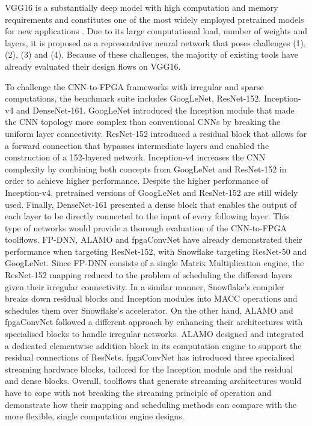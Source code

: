 \documentclass[format=acmsmall, review=false, screen=true]{acmart}
\begin{document}
VGG16 is a substantially deep model with high computation and memory requirements and constitutes one of the most widely employed pretrained models for new applications \cite{Badrinarayanan_2017}. Due to its large computational load, number of weights and layers, it is proposed as a representative neural network that poses challenges (1), (2), (3) and (4). Because of these challenges, the majority of existing tools have already evaluated their design flows on VGG16.

To challenge the CNN-to-FPGA frameworks with irregular and sparse computations, the benchmark suite includes GoogLeNet, ResNet-152, Inception-v4 {\color{black}and DenseNet-161}. GoogLeNet introduced the Inception module that made the CNN topology more complex than conventional CNNs by breaking the uniform layer connectivity. ResNet-152 introduced a residual block that allows for a forward connection that bypasses intermediate layers and enabled the construction of a 152-layered network. Inception-v4 increases the CNN complexity by combining both concepts from GoogLeNet and ResNet-152 in order to achieve higher performance. Despite the higher performance of Inception-v4, pretrained versions of GoogLeNet and ResNet-152 are still widely used. {\color{black}Finally, DenseNet-161 presented a dense block that enables the output of each layer to be directly connected to the input of every following layer.} This type of networks would provide a thorough evaluation of the CNN-to-FPGA toolflows. FP-DNN, ALAMO and fpgaConvNet have already demonstrated their performance when targeting ResNet-152, with Snowflake targeting ResNet-50 and GoogLeNet. Since FP-DNN consists of a single Matrix Multiplication engine, the ResNet-152 mapping reduced to the problem of scheduling the different layers given their irregular connectivity. {\color{black}In a similar manner, Snowflake's compiler breaks down residual blocks and Inception modules into MACC operations and schedules them over Snowflake's accelerator. On the other hand, ALAMO and fpgaConvNet followed a different approach by enhancing their architectures with specialised blocks to handle irregular networks. ALAMO designed and integrated a dedicated elementwise addition block in its computation engine to support the residual connections of ResNets. fpgaConvNet has introduced three specialised streaming hardware blocks, tailored for the Inception module and the residual and dense blocks.} Overall, toolflows that generate streaming architectures would have to cope with not breaking the streaming principle of operation and demonstrate how their mapping and scheduling methods can compare with the more flexible, single computation engine designs. 
\end{document}
